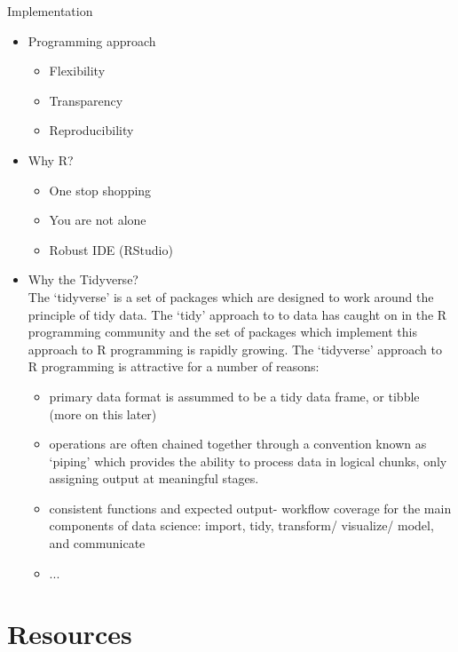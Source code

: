 \documentclass[
  letterpaper,
]{scrbook}
\begin{document}
Implementation

\begin{itemize}
\item
  Programming approach

  \begin{itemize}
  \item
    Flexibility
  \item
    Transparency
  \item
    Reproducibility
  \end{itemize}
\item
  Why R?

  \begin{itemize}
  \item
    One stop shopping
  \item
    You are not alone
  \item
    Robust IDE (RStudio)
  \end{itemize}
\item
  Why the Tidyverse?\\
  The `tidyverse' is a set of packages which are designed to work around
  the principle of tidy data. The `tidy' approach to to data has caught
  on in the R programming community and the set of packages which
  implement this approach to R programming is rapidly growing. The
  `tidyverse' approach to R programming is attractive for a number of
  reasons:

  \begin{itemize}
  \item
    primary data format is assummed to be a tidy data frame, or tibble
    (more on this later)
  \item
    operations are often chained together through a convention known as
    `piping' which provides the ability to process data in logical
    chunks, only assigning output at meaningful stages.
  \item
    consistent functions and expected output- workflow coverage for the
    main components of data science: import, tidy, transform/ visualize/
    model, and communicate
  \item
    ...
  \end{itemize}
\end{itemize}

\hypertarget{resources}{%
\section*{Resources}\label{resources}}
\end{document}
